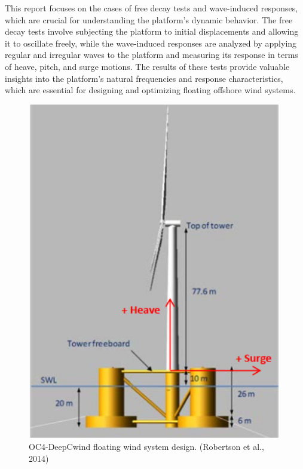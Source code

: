\documentclass[a4paper, 11pt]{article}
\begin{document}
This report focuses on the cases of free decay tests and wave-induced responses, which are crucial for understanding the platform's dynamic behavior. The free decay tests involve subjecting the platform to initial displacements and allowing it to oscillate freely, while the wave-induced responses are analyzed by applying regular and irregular waves to the platform and measuring its response in terms of heave, pitch, and surge motions.
The results of these tests provide valuable insights into the platform's natural frequencies and response characteristics, which are essential for designing and optimizing floating offshore wind systems.
\vspace{0.5cm}

\begin{figure}[htbp]
    \begin{minipage}{0.47\textwidth}
        \centering
        \includegraphics[width=0.99\textwidth]{OC4.png}
        \caption{\small OC4-DeepCwind floating wind system design. (Robertson et al., 2014)}

\end{minipage}
\end{figure}
\end{document}
